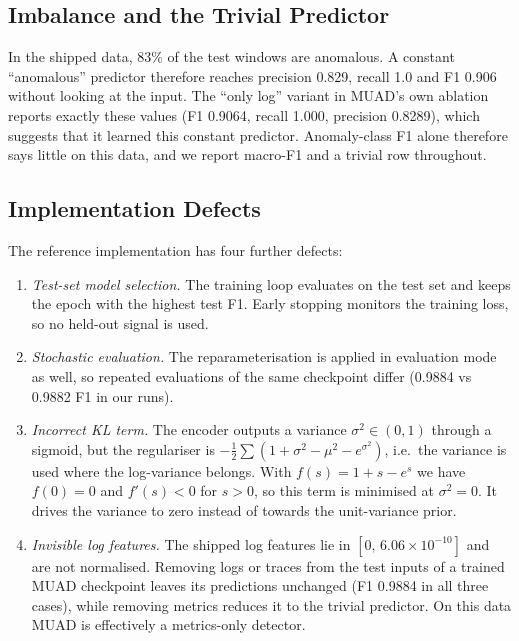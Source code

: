 \documentclass[journal]{IEEEtran}
\begin{document}
\subsection{Imbalance and the Trivial Predictor}
In the shipped data, 83\% of the test windows are anomalous. A constant ``anomalous'' predictor therefore
reaches precision 0.829, recall 1.0 and F1 0.906 without looking at the input. The ``only log'' variant in
MUAD's own ablation reports exactly these values (F1 0.9064, recall 1.000, precision 0.8289), which suggests
that it learned this constant predictor. Anomaly-class F1 alone therefore says little on this data, and we
report macro-F1 and a trivial row throughout.

\subsection{Implementation Defects}
The reference implementation has four further defects:
\begin{enumerate}
  \item \emph{Test-set model selection.} The training loop evaluates on the test set and keeps the epoch with
  the highest test F1. Early stopping monitors the training loss, so no held-out signal is used.
  \item \emph{Stochastic evaluation.} The reparameterisation is applied in evaluation mode as well, so
  repeated evaluations of the same checkpoint differ (0.9884 vs 0.9882 F1 in our runs).
  \item \emph{Incorrect KL term.} The encoder outputs a variance $\sigma^2\in(0,1)$ through a sigmoid, but the
  regulariser is $-\tfrac12\sum(1+\sigma^2-\mu^2-e^{\sigma^2})$, i.e.\ the variance is used where the
  log-variance belongs. With $f(s)=1+s-e^{s}$ we have $f(0)=0$ and $f'(s)<0$ for $s>0$, so this term is
  minimised at $\sigma^2=0$. It drives the variance to zero instead of towards the unit-variance prior.
  \item \emph{Invisible log features.} The shipped log features lie in $[0,\,6.06\times10^{-10}]$ and are not
  normalised. Removing logs or traces from the test inputs of a trained MUAD checkpoint leaves its
  predictions unchanged (F1 0.9884 in all three cases), while removing metrics reduces it to the trivial
  predictor. On this data MUAD is effectively a metrics-only detector.
\end{enumerate}
\end{document}
